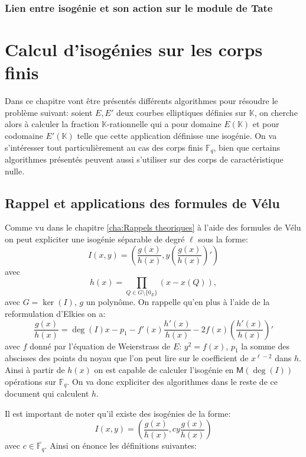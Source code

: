 \documentclass[10pt,a4paper]{book}
\theoremstyle{plain}
\theoremstyle{definition}
\theoremstyle{definition}
\theoremstyle{definition}
\theoremstyle{definition}
\theoremstyle{remark}
\theoremstyle{remark}
\theoremstyle{definition}
\begin{document}
\subsection{Lien entre isogénie et son action sur le module de Tate}

\chapter{Calcul d'isogénies sur les corps finis}
Dans ce chapitre vont être présentés différents algorithmes pour résoudre le problème suivant: soient $E, E'$ deux courbes elliptiques définies sur $\mathbb{K}$, on cherche alors à calculer la fraction $\mathbb{K}$-rationnelle qui a pour domaine $E(\mathbb{K})$ et pour codomaine $E'(\mathbb{K})$  telle que  cette application  définisse une isogénie.
On va s'intéresser tout particulièrement au cas des corps finis $\mathbb{F}_q$, bien que certains algorithmes présentés peuvent aussi s'utiliser sur des corps de caractéristique nulle.

\section{Rappel et applications des formules de Vélu}
Comme vu dans le chapitre \ref{cha:Rappels theoriques} à l'aide des formules de Vélu on peut expliciter une isogénie séparable de degré $\ell$ sous la forme:
\begin{equation} 
\label{eq:velu:gh}
I(x,y)=\left(\frac{g(x)}{h(x)},y\left( \frac{g(x)}{h(x)} \right)'\right)
\end{equation}
avec 
\begin{equation*}
h(x)=\prod_{Q \in G \setminus \{0_E\}}(x-x(Q)),
\end{equation*}
avec $G=\ker(I)$, $g$ un polynôme. On rappelle qu'en plus à l'aide de la reformulation d'Elkies on a:
\begin{equation}
\label{eq:vel:elk}
\frac{g(x)}{h(x)}= \deg(I) x -p_1 - f'(x) \frac{h'(x)}{h(x)} -2f(x)  \left(\frac{h'(x)}{h(x)}\right)'
\end{equation}
avec $f$ donné par l'équation de Weierstrass de $E$: $y^2=f(x)$, $p_1$ la somme des abscisses des points du noyau que l'on peut lire sur le coefficient de $x^{\ell-2}$ dans $h$. Ainsi à partir de $h(x)$ on est capable de calculer l'isogénie en $\mathsf{M}(\deg(I))$ opérations sur $\mathbb{F}_q$. On va donc expliciter des algorithmes dans le reste de ce document qui calculent $h$.


Il est important de noter qu'il existe des isogénies de la forme:
\begin{equation}
\label{eq:iso:gen}
I(x,y)=\left( \frac{g(x)}{h(x)},cy\frac{g(x)}{h(x)} \right)
\end{equation}
avec $c \in \overline{\mathbb{F}_q}$. Ainsi on énonce les définitions suivantes:
\end{document}
